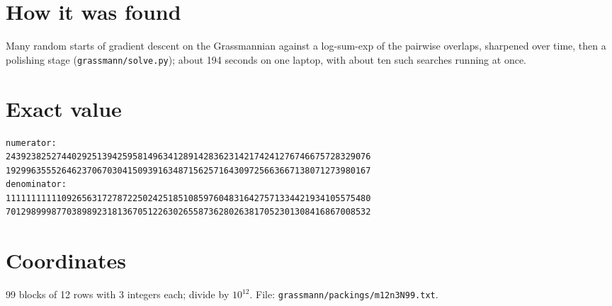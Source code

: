 \documentclass[11pt,a4paper]{article}
\begin{document}
\section{How it was found}
Many random starts of gradient descent on the Grassmannian against a log-sum-exp of the pairwise overlaps, sharpened over time, then a polishing stage (\texttt{grassmann/solve.py}); about 194 seconds on one laptop, with about ten such searches running at once.


\appendix
\section{Exact value}
{\small
\begin{verbatim}
numerator:
243923825274402925139425958149634128914283623142174241276746675728329076
192996355526462370670304150939163487156257164309725663667138071273980167
denominator:
111111111110926563172787225024251851085976048316427571334421934105575480
701298999877038989231813670512263026558736280263817052301308416867008532
\end{verbatim}}

\section{Coordinates}
99 blocks of 12 rows with 3 integers each; divide by $10^{12}$. File: \texttt{grassmann/packings/m12n3N99.txt}.
{\tiny
\begin{multicols}{3}
\end{multicols}}
\end{document}
